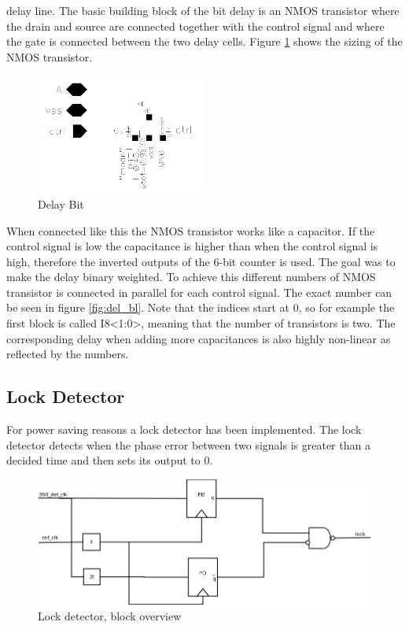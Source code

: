 \documentclass[a4paper,12pt]{article} \usepackage{graphicx}
\begin{document}
delay line. 
The basic building block of the
bit delay is an NMOS transistor where the drain and source are connected
together with the control signal and where the gate is connected between the two
delay cells. Figure \ref{fig:del_bit} shows the sizing of the NMOS transistor.
\begin{figure}[h]
        \centering
        \includegraphics[width=0.5\textwidth]{../Bilder/Delay_Line/Delay_bit.png}
        \caption{Delay Bit}
        \label{fig:del_bit}
\end{figure}
When connected like this the NMOS transistor works like a capacitor. If the control
signal is low the capacitance is higher than when the control signal is high,
therefore the inverted outputs of the 6-bit counter is used. The goal was to
make the delay binary weighted. To achieve this different numbers of NMOS
transistor is connected in parallel for each control signal. The exact number
can be seen in figure \ref{fig:del_bl}. Note that the indices start at 0, so for
example the first block is called I8<1:0>, meaning that the number of
transistors is two. The corresponding delay when adding more capacitances is
also highly non-linear as reflected by the numbers.

\subsection{Lock Detector}
\label{sec:lck_det}
For power saving reasons a lock detector has been implemented. The
lock detector detects when the phase error between two signals is
greater than a decided time and then sets its output to 0.

\begin{figure}[h]
        \centering
        \includegraphics[width=150mm]{../Bilder/Lockdetector.png}
        \caption{Lock detector, block overview}
        \label{fig:LD_block}
\end{figure}
\end{document}
